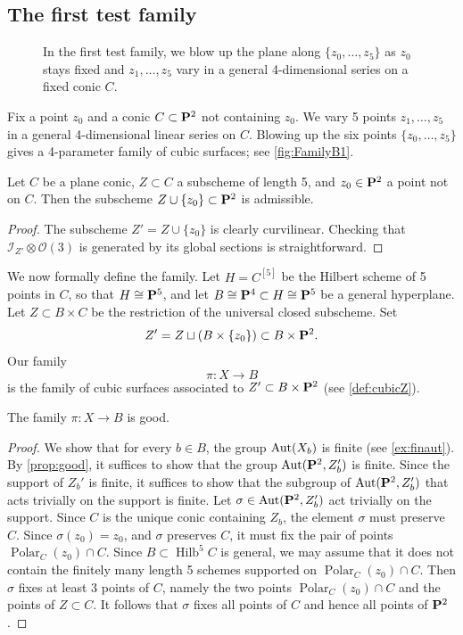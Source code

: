 \documentclass[12pt,reqno]{amsart}
\DeclareMathOperator{\Polar}{Polar}
\DeclareMathOperator{\Hilb}{Hilb}
\renewcommand{\to}{{\longrightarrow}}
\numberwithin{equation}{section}
\renewcommand{\O}{\mathcal O}
\begin{document}
\subsection{The first test family}
\label{sec:family-b_1}
\begin{figure}
  \centering
  
  \caption{In the first test family, we blow up the plane along $\{z_0, \dots, z_5\}$ as $z_0$ stays fixed and $z_1,\dots,z_5$ vary in a general 4-dimensional series on a fixed conic $C$.}
  \label{fig:FamilyB1}
\end{figure}
Fix a point $z_0$ and a conic $C \subset \P^2$ not containing $z_0$.
We vary 5 points $z_1, \dots, z_5$ in a general 4-dimensional linear series on $C$.
Blowing up the six points $\{z_0, \dots, z_5\}$ gives a 4-parameter family of cubic surfaces; see \autoref{fig:FamilyB1}.
\begin{proposition}
  \label{prop:B1}
  Let $C$ be a plane conic, $Z \subset C$ a subscheme of length 5, and $z_0 \in \P^2$ a point not on $C$.
  Then the subscheme $Z \cup \{z_0\} \subset \P^2$ is admissible.
\end{proposition}
\begin{proof}
  The subscheme $Z' = Z \cup \{z_0\}$ is clearly curvilinear.
  Checking that $\mathcal I_{Z'} \otimes \O(3)$ is generated by its global sections is straightforward.
\end{proof}

We now formally define the family.
Let $H = C^{[5]}$ be the Hilbert scheme of 5 points in $C$, so that $H \cong \P^5$, and let $B \cong \P^4 \subset H \cong \P^5$ be a general hyperplane.
Let $Z \subset B \times C$ be the restriction of the universal closed subscheme.
Set 
\[Z' = Z \sqcup \left(B \times \{z_0\}\right) \subset B \times \P^2.\]
Our family
\[\pi \colon X \to B\]
is the family of cubic surfaces associated to $Z' \subset B \times \P^2$ (see \autoref{def:cubicZ}).
\begin{proposition}\label{prop:goodnessB1}
  The family $\pi \colon X \to B$ is good.
\end{proposition}
\begin{proof}
  We show that for every $b \in B$, the group $\Aut(X_b)$ is finite (see \autoref{ex:finaut}).
  By \autoref{prop:good}, it suffices to show that the group $\Aut(\P^2, Z_b')$ is finite.
  Since the support of $Z_b'$ is finite, it suffices to show that the subgroup of $\Aut(\P^2, Z'_b)$ that acts trivially on the support is finite.
  Let $\sigma \in \Aut(\P^2, Z'_b)$ act trivially on the support.
  Since $C$ is the unique conic containing $Z_b$, the element $\sigma$ must preserve $C$.
  Since $\sigma(z_0) = z_0$, and $\sigma$ preserves $C$, it must fix the pair of points $\Polar_C(z_0) \cap C$.
  Since $B \subset \Hilb^5C$ is general, we may assume that it does not contain the finitely many length 5 schemes supported on $\Polar_C(z_0) \cap C$.
  Then $\sigma$ fixes at least 3 points of $C$, namely the two points $\Polar_C(z_0) \cap C$ and the points of $Z \subset C$.
  It follows that $\sigma$ fixes all points of $C$ and hence all points of $\P^2$.
\end{proof}
\end{document}
